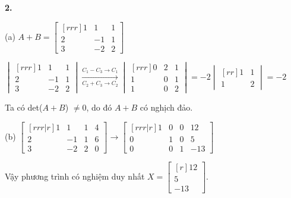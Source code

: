 \documentclass{article}
\begin{document}
    \begin{minipage}[t]{0.48\linewidth}
    \textbf{2.}
    
    (a) $A  + B = \begin{bmatrix}[rrr]
        1 & 1 & 1 \\
        2 & -1 & 1 \\
        3 & -2 & 2 
    \end{bmatrix} $

    $ \begin{vmatrix}[rrr]
        1 & 1 & 1 \\
        2 & -1 & 1 \\
        3 & -2 & 2 
    \end{vmatrix} \xrightarrow[C_2 + C_3 \to C_2]{C_1 - C_3 \to C_1} \begin{vmatrix}[rrr]
        0 & 2 & 1 \\
        1 & 0 & 1 \\
        1 & 0 & 2 
    \end{vmatrix} = -2 \begin{vmatrix}[rr]
        1 & 1 \\
        1 & 2 
    \end{vmatrix} = -2$

    Ta có det($A + B$) $\ne 0$, do đó $A + B$ có nghịch đảo.

    (b) $ \begin{bmatrix}[rrr|r]
        1 & 1 & 1 & 4 \\
        2 & -1 & 1 & 6 \\
        3 & -2 & 2 & 0 
    \end{bmatrix} \to \begin{bmatrix}[rrr|r]
        1 & 0 & 0 & 12 \\
        0 & 1 & 0 & 5 \\
        0 & 0 & 1 & -13 
    \end{bmatrix} $

    Vậy phương trình có nghiệm duy nhất $X = \begin{bmatrix}[r]
        12 \\
        5 \\
        -13 
    \end{bmatrix} $.

        
    \end{minipage}
\end{document}
